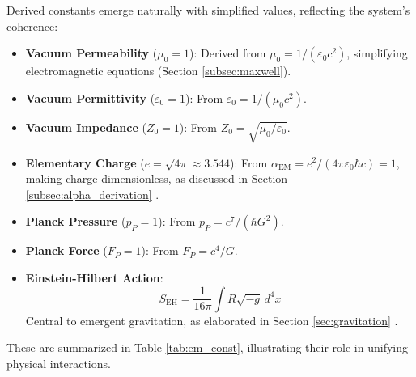 \documentclass[12pt,a4paper]{article}
\begin{document}
	Derived constants emerge naturally with simplified values, reflecting the system’s coherence:
	\begin{itemize}
		\item \textbf{Vacuum Permeability} (\(\mu_0 = 1\)): Derived from \(\mu_0 = 1/(\varepsilon_0 c^2)\), simplifying electromagnetic equations (Section \ref{subsec:maxwell}).
		\item \textbf{Vacuum Permittivity} (\(\varepsilon_0 = 1\)): From \(\varepsilon_0 = 1/(\mu_0 c^2)\).
		\item \textbf{Vacuum Impedance} (\(Z_0 = 1\)): From \(Z_0 = \sqrt{\mu_0/\varepsilon_0}\).
		\item \textbf{Elementary Charge} (\(e = \sqrt{4\pi} \approx 3.544\)): From \(\alpha_{\text{EM}} = e^2/(4\pi \varepsilon_0 \hbar c) = 1\), making charge dimensionless, as discussed in Section \ref{subsec:alpha_derivation} \cite{Dirac1928}.
		\item \textbf{Planck Pressure} (\(p_P = 1\)): From \(p_P = c^7/(\hbar G^2)\).
		\item \textbf{Planck Force} (\(F_P = 1\)): From \(F_P = c^4/G\).
		\item \textbf{Einstein-Hilbert Action}:
		\[
		S_{\text{EH}} = \frac{1}{16\pi} \int R \sqrt{-g} \, d^4x
		\]
		Central to emergent gravitation, as elaborated in Section \ref{sec:gravitation} \cite{pascher_emergente_2025}.
	\end{itemize}
	
	These are summarized in Table \ref{tab:em_const}, illustrating their role in unifying physical interactions.
	
\end{document}
